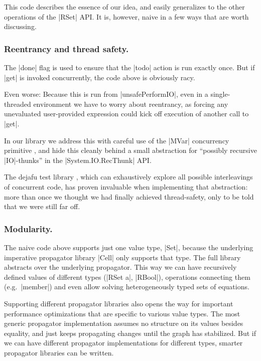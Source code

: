 \documentclass[manuscript,anonymous,screen,acmsmall]{acmart}
\begin{document}
This code describes the essence of our idea, and easily generalizes to the other operations of the |RSet| API. It is, however, naive in a few ways that are worth discussing.

\subsubsection{Reentrancy and thread safety.}\label{sec:thread}

The |done| flag is used to ensure that the |todo| action is run exactly once. But if |get| is invoked concurrently, the code above is obviously racy.

Even worse: Because this is run from |unsafePerformIO|, even in a single-threaded environment we have to worry about reentrancy, as forcing any unevaluated user-provided expression could kick off execution of another call to |get|.

In our library we address this with careful use of the |MVar| concurrency primitive \cite{concurrent}, and hide this cleanly behind a small abstraction for “possibly recursive |IO|-thunks” in the |System.IO.RecThunk| API.

The dejafu test library \citep{dejafu}, which can exhaustively explore all possible interleavings of concurrent code, has proven invaluable when implementing that abstraction: more than once we thought we had finally achieved thread-safety, only to be told that we were still far off.

\subsubsection{Modularity.}

The naive code above supports just one value type, |Set|, because the underlying imperative propagator library |Cell| only supports that type. The full library abstracts over the underlying propagator. This way we can have recursively defined values of different types (|RSet a|, |RBool|), operations connecting them (e.g.\ |member|) and even allow solving heterogeneously typed sets of equations.

Supporting different propagator libraries also opens the way for important performance optimizations that are specific to various value types. The most generic propagator implementation assumes no structure on its values besides equality, and just keeps propagating changes until the graph has stabilized. But if we can have different propagator implementations for different types, smarter propagator libraries can be written.
\end{document}
